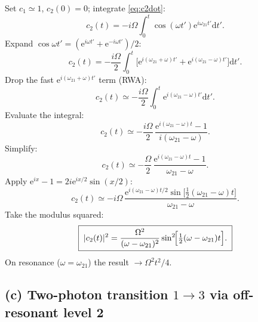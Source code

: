 \documentclass[11pt]{article}
\newcommand{\de}{\mathrm{d}}
\begin{document}
Set $c_{1}\simeq 1$, $c_{2}(0)=0$; integrate \eqref{eq:c2dot}:
\begin{equation}
c_{2}(t)=-i\Omega\int_{0}^{t}\cos(\omega t')\mathrm{e}^{i\omega_{21}t'}\de t'.
\end{equation}
Expand $\cos\omega t'=(\mathrm{e}^{i\omega t'}+\mathrm{e}^{-i\omega t'})/2$:
\begin{equation}
c_{2}(t)=-\frac{i\Omega}{2}\int_{0}^{t}\bigl[\mathrm{e}^{i(\omega_{21}+\omega)t'}+\mathrm{e}^{i(\omega_{21}-\omega)t'}\bigr]\de t'.
\label{eq:c2-int}
\end{equation}
Drop the fast $\mathrm{e}^{i(\omega_{21}+\omega)t'}$ term (RWA):
\begin{equation}
c_{2}(t)\simeq -\frac{i\Omega}{2}\int_{0}^{t}\mathrm{e}^{i(\omega_{21}-\omega)t'}\de t'.
\end{equation}
Evaluate the integral:
\begin{equation}
c_{2}(t)\simeq -\frac{i\Omega}{2}\,\frac{\mathrm{e}^{i(\omega_{21}-\omega)t}-1}{i(\omega_{21}-\omega)}.
\end{equation}
Simplify:
\begin{equation}
c_{2}(t)\simeq -\frac{\Omega}{2}\,\frac{\mathrm{e}^{i(\omega_{21}-\omega)t}-1}{\omega_{21}-\omega}.
\end{equation}
Apply $\mathrm{e}^{ix}-1=2i\mathrm{e}^{ix/2}\sin(x/2)$:
\begin{equation}
c_{2}(t)\simeq -i\Omega\,\frac{\mathrm{e}^{i(\omega_{21}-\omega)t/2}\sin\!\bigl[\tfrac{1}{2}(\omega_{21}-\omega)t\bigr]}{\omega_{21}-\omega}.
\label{eq:c2-RWA}
\end{equation}
Take the modulus squared:
\begin{equation}
\boxed{\;|c_{2}(t)|^{2}=\frac{\Omega^{2}}{(\omega-\omega_{21})^{2}}\sin^{2}\!\Bigl[\tfrac{1}{2}(\omega-\omega_{21})t\Bigr].\;}
\label{eq:c2sq}
\end{equation}
On resonance ($\omega=\omega_{21}$) the result $\to\Omega^{2}t^{2}/4$.

\subsection*{(c) Two-photon transition $1\to 3$ via off-resonant level 2}
\end{document}

